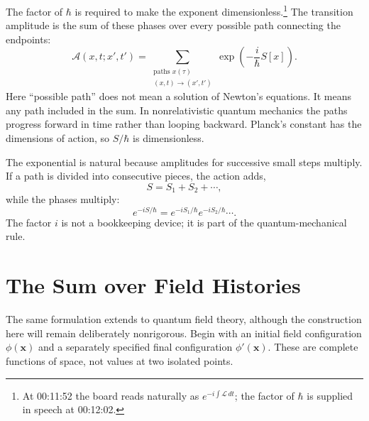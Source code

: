 The factor of \(\hbar\) is required to make the exponent dimensionless.\footnote{At 00:11:52 the board reads naturally as \(e^{-i\int\mathcal{L}\,dt}\); the factor of \(\hbar\) is supplied in speech at 00:12:02.} The transition amplitude is the sum of these phases over every possible path connecting the endpoints:
\begin{equation}
\mathcal{A}(x,t;x',t')
=
\sum_{\substack{\text{paths }x(\tau)\\(x,t)\rightarrow(x',t')}}
\exp\!\left(-\frac{i}{\hbar}S[x]\right).
\end{equation}
Here ``possible path'' does not mean a solution of Newton's equations. It means any path included in the sum. In nonrelativistic quantum mechanics the paths progress forward in time rather than looping backward. Planck's constant has the dimensions of action, so \(S/\hbar\) is dimensionless.

The exponential is natural because amplitudes for successive small steps multiply. If a path is divided into consecutive pieces, the action adds,
\begin{equation}
S=S_1+S_2+\cdots,
\end{equation}
while the phases multiply:
\begin{equation}
e^{-iS/\hbar}
=e^{-iS_1/\hbar}e^{-iS_2/\hbar}\cdots.
\end{equation}
The factor \(i\) is not a bookkeeping device; it is part of the quantum-mechanical rule.

\begin{classroomqa}
\end{classroomqa}

\begin{classroomqa}
\end{classroomqa}

\section{The Sum over Field Histories}

The same formulation extends to quantum field theory, although the construction here will remain deliberately nonrigorous. Begin with an initial field configuration \(\phi(\mathbf{x})\) and a separately specified final configuration \(\phi'(\mathbf{x})\). These are complete functions of space, not values at two isolated points.

